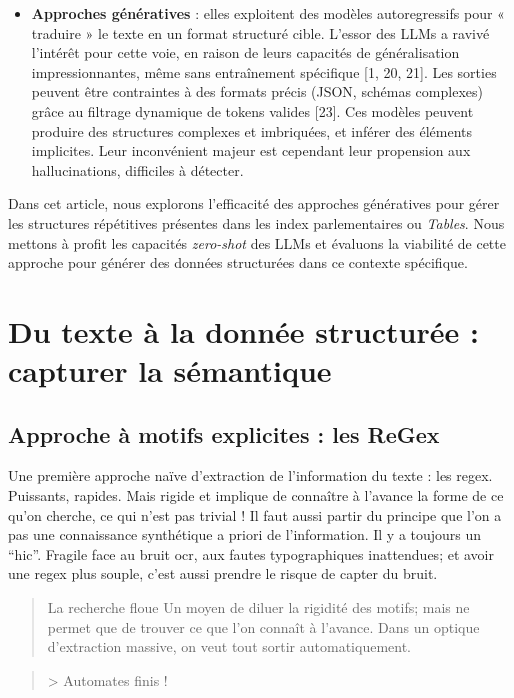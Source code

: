 \begin{itemize}
\item \textbf{Approches génératives} : elles exploitent des modèles autoregressifs pour « traduire » le texte en un format structuré cible. L’essor des LLMs a ravivé l’intérêt pour cette voie, en raison de leurs capacités de généralisation impressionnantes, même sans entraînement spécifique [1, 20, 21]. Les sorties peuvent être contraintes à des formats précis (JSON, schémas complexes) grâce au filtrage dynamique de tokens valides [23]. Ces modèles peuvent produire des structures complexes et imbriquées, et inférer des éléments implicites. Leur inconvénient majeur est cependant leur propension aux hallucinations, difficiles à détecter.
\end{itemize}

Dans cet article, nous explorons l’efficacité des approches génératives pour gérer les structures répétitives présentes dans les index parlementaires ou \emph{Tables}. Nous mettons à profit les capacités \emph{zero-shot} des LLMs et évaluons la viabilité de cette approche pour générer des données structurées dans ce contexte spécifique.

\chapter{Du texte à la donnée structurée : capturer la sémantique}

\section{Approche à motifs explicites : les ReGex}

Une première approche naïve d'extraction de l'information du texte : les regex. Puissants, rapides. Mais rigide et implique de connaître à l'avance la forme de ce qu'on cherche, ce qui n'est pas trivial ! Il faut aussi partir du principe que l'on a pas une connaissance synthétique a priori de l'information. Il y a toujours un \enquote{hic}. Fragile face au bruit ocr, aux fautes typographiques inattendues; et avoir une regex plus souple, c'est aussi prendre le risque de capter du bruit.

\begin{quote}La recherche floue Un moyen de diluer la rigidité des motifs; mais ne permet que de trouver ce que l'on connaît à l'avance. Dans un optique d'extraction massive, on veut tout sortir automatiquement.\end{quote}
\begin{quote}\end{quote}
\begin{quote}> Automates finis !\end{quote}

